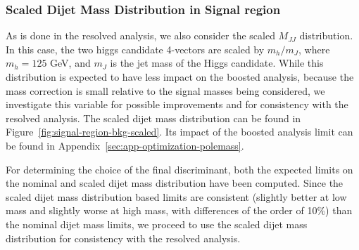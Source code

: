 
\clearpage
\subsubsection{Scaled Dijet Mass Distribution in Signal region}
\label{sec:boosted-SR-mjjscaled}

As is done in the resolved analysis, we also consider the scaled $M_{JJ}$ distribution.  In this case, the two higgs candidate 4-vectors are scaled by $m_{h} / m_{J}$, where $m_h = 125$ GeV, and $m_{J}$ is the \largeR jet mass of the Higgs candidate.  While this distribution is expected to have less impact on the boosted analysis, because the mass correction is small relative to the signal masses being considered, we investigate this variable for possible improvements and for consistency with the resolved analysis. The scaled dijet mass distribution can be found in Figure~\ref{fig:signal-region-bkg-scaled}. Its impact of the boosted analysis limit can be found in Appendix~\ref{sec:app-optimization-polemass}.

For determining the choice of the final discriminant, both the expected limits on the nominal and scaled dijet mass distribution have been computed.  Since the scaled dijet  mass distribution based limits are consistent (slightly better at low mass and slightly worse at high mass, with differences of the order of 10\%) than the nominal dijet mass limits, we  proceed to use the scaled dijet mass distribution for consistency with the resolved analysis.


